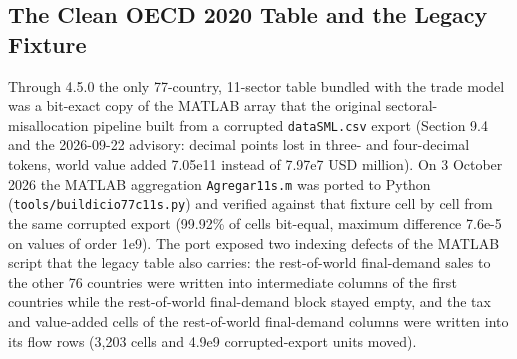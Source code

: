 \documentclass[11pt,letterpaper]{article}
\renewcommand{\_}{\pmunderscore\allowbreak}
\begin{document}
\subsection{The Clean OECD 2020 Table and the Legacy Fixture}\label{the-clean-oecd-2020-table-and-the-legacy-fixture}

Through 4.5.0 the only 77-country, 11-sector table bundled with the trade model was a bit-exact copy of the MATLAB array that the original sectoral-misallocation pipeline built from a corrupted \texttt{data\_2020\_SML.csv} export (Section 9.4 and the 2026-09-22 advisory: decimal points lost in three- and four-decimal tokens, world value added 7.05e11 instead of 7.97e7 USD million). On 3 October 2026 the MATLAB aggregation \texttt{Agregar\_11s.m} was ported to Python (\texttt{tools/build\_icio\_77c\_11s.py}) and verified against that fixture cell by cell from the same corrupted export (99.92\% of cells bit-equal, maximum difference 7.6e-5 on values of order 1e9). The port exposed two indexing defects of the MATLAB script that the legacy table also carries: the rest-of-world final-demand sales to the other 76 countries were written into intermediate columns of the first countries while the rest-of-world final-demand block stayed empty, and the tax and value-added cells of the rest-of-world final-demand columns were written into its flow rows (3,203 cells and 4.9e9 corrupted-export units moved).
\end{document}
